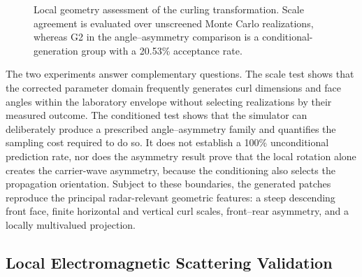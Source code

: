 \begin{figure}[!t]
\centering
{}
\caption{Local geometry assessment of the curling transformation. Scale agreement is evaluated over unscreened Monte Carlo realizations, whereas G2 in the angle--asymmetry comparison is a conditional-generation group with a 20.53\% acceptance rate.}
\label{fig:local_curl_geometry_validation}
\end{figure}

The two experiments answer complementary questions. The scale test shows that the corrected parameter domain frequently generates curl dimensions and face angles within the laboratory envelope without selecting realizations by their measured outcome. The conditioned test shows that the simulator can deliberately produce a prescribed angle--asymmetry family and quantifies the sampling cost required to do so. It does not establish a 100\% unconditional prediction rate, nor does the asymmetry result prove that the local rotation alone creates the carrier-wave asymmetry, because the conditioning also selects the propagation orientation. Subject to these boundaries, the generated patches reproduce the principal radar-relevant geometric features: a steep descending front face, finite horizontal and vertical curl scales, front--rear asymmetry, and a locally multivalued projection.











\subsection{Local Electromagnetic Scattering Validation}
\label{subsec:local_electromagnetic_validation}

